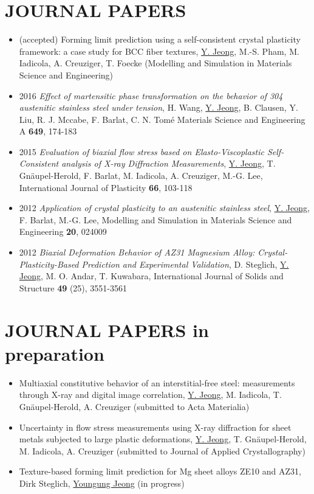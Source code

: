 \documentclass{res}
\begin{document}
\begin{resume}
  \section{JOURNAL PAPERS}
  \begin{itemize}
  \item (accepted) Forming limit prediction using a self-consistent crystal plasticity framework: a case study for BCC fiber textures, \underline{Y. Jeong}, M.-S. Pham, M. Iadicola, A. Creuziger, T. Foecke (Modelling and Simulation in Materials Science and Engineering)
  \item 2016 {\it Effect of martensitic phase transformation on the behavior of 304 austenitic stainless steel under tension}, H. Wang, \underline{Y. Jeong}, B. Clausen, Y. Liu, R. J. Mccabe, F. Barlat, C. N. Tom\'{e} Materials Science and Engineering A {\bf 649}, 174-183
  \item 2015 {\it Evaluation of biaxial flow stress based on Elasto-Viscoplastic Self-Consistent analysis of X-ray Diffraction Measurements}, \underline{Y. Jeong}, T. Gn\"{a}upel-Herold, F. Barlat, M. Iadicola, A. Creuziger, M.-G. Lee, International Journal of Plasticity {\bf 66}, 103-118
  \item 2012 {\it Application of crystal plasticity to an austenitic stainless steel}, \underline{Y. Jeong}, F. Barlat, M.-G. Lee, Modelling and Simulation in Materials Science and Engineering {\bf 20}, 024009
  \item 2012 {\it Biaxial Deformation Behavior of AZ31 Magnesium Alloy: Crystal-Plasticity-Based Prediction and Experimental Validation}, D. Steglich, \underline{Y. Jeong}, M. O. Andar, T. Kuwabara, International Journal of Solids and Structure {\bf 49} (25), 3551-3561
  \end{itemize}

  \section{JOURNAL PAPERS in preparation}
  \begin{itemize}
  \item Multiaxial constitutive behavior of an interstitial-free steel: measurements through X-ray and digital image correlation, \underline{Y. Jeong}, M. Iadicola, T. Gn\"{a}upel-Herold, A. Creuziger (submitted to Acta Materialia)
  \item Uncertainty in flow stress measurements using X-ray diffraction for sheet metals subjected to large plastic deformations, \underline{Y. Jeong}, T. Gn\"{a}upel-Herold, M. Iadicola, A. Creuziger (submitted to Journal of Applied Crystallography)
  \item Texture-based forming limit prediction for Mg sheet alloys ZE10 and AZ31, Dirk Steglich, \underline{Youngung Jeong} (in progress)
  \end{itemize}


\end{resume}
\end{document}
